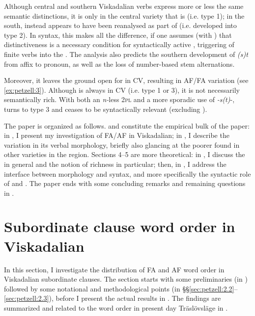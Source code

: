 \documentclass[output=paper,colorlinks,citecolor=brown,draft,draftmode]{langscibook}
\begin{document}
Although central and southern Viskadalian verbs express more or less the same semantic distinctions, it is only in the central variety that  is  (i.e. type 1); in the south,  instead appears to have been reanalysed as part of  (i.e. developed into type 2). In syntax, this makes all the difference, if one assumes (with \citealt{BobaljikThrainsson1998}) that distinctiveness is a necessary condition for syntactically active , triggering  of finite verbs into the . The analysis also predicts the southern development of \textit{(s)t} from affix to pronoun, as well as the loss of number-based stem alternations. 



Moreover, it leaves the ground open for  in CV, resulting in AF/FA variation (see \ref{ex:petzell:3}). Although  is always  in CV (i.e. type 1 or 3), it is not necessarily semantically rich. With both an \textit{n-}less 2\textsc{pl} and a more sporadic use of \textit{-s(t)}-,  turns to type 3 and ceases to be syntactically relevant (excluding ).



The paper is organized as follows.  and  constitute the empirical bulk of the paper: in , I present my investigation of FA/AF in Viskadalian; in , I describe the variation in its verbal morphology, briefly also glancing at the poorer  found in other varieties in the region. Sections 4–5 are more theoretical: in , I discuss the  in general and the notion of richness in particular; then, in , I address the interface between morphology and syntax, and more specifically the syntactic role of  and  . The paper ends with some concluding remarks and remaining questions in .


\section{Subordinate clause word order in Viskadalian}\label{sec:petzell:2}


In this section, I investigate the distribution of FA and AF word order in Viskadalian subordinate clauses. The section starts with some preliminaries (in ) followed by some notational and methodological points (in §§\ref{sec:petzell:2.2}--\ref{sec:petzell:2.3}), before I present the actual results in . The findings are summarized and related to the word order in present day Träslövsläge in .
\end{document}
